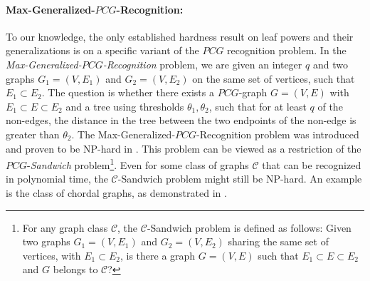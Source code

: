 \documentclass[11pt, letter]{article}
\theoremstyle{remark}
\begin{document}
\paragraph{Max-Generalized-$PCG$-Recognition:} To our knowledge, the only established hardness result on leaf powers and their generalizations is on a specific variant of the $PCG$ recognition problem. 
In the \emph{Max-Generalized-$PCG$-Recognition} problem, we are given an integer $q$ and two graphs $G_1 = (V, E_1)$ and $G_2 = (V, E_2)$ on the same set of vertices, such that $E_1 \subset E_2$. The question is whether there exists a $PCG$-graph $G = (V, E)$ with $E_1 \subset E \subset E_2$ and a tree using thresholds $\theta_1, \theta_2$, such that for at least $q$ of the non-edges, the distance in the tree between the two endpoints of the non-edge is greater than $\theta_2$.  The Max-Generalized-$PCG$-Recognition problem was introduced and proven to be NP-hard in \cite{durocher2015graphs}. This problem can be viewed as a restriction of the $PCG$-\emph{Sandwich} problem\footnote{For any graph class $\mathcal{C}$, the $\mathcal{C}$-Sandwich problem is defined as follows: Given two graphs $G_1 = (V, E_1)$ and $G_2 = (V, E_2)$ sharing the same set of vertices, with $E_1 \subset E_2$, is there a graph $G = (V, E)$ such that $E_1 \subset E \subset E_2$ and $G$ belongs to $\mathcal{C}$?}.
Even for some class of graphs $\mathcal{C}$ that can be recognized in polynomial time, the $\mathcal{C}$-Sandwich problem might still be NP-hard. An example is the class of chordal graphs, as demonstrated in \cite{GOLUMBIC1995449}. 







\end{document}
